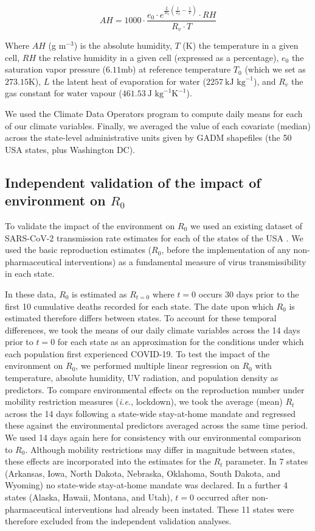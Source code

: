 \documentclass[12pt,english,a4paper]{article}
\newcommand{\virus}{SARS-CoV-2\xspace}
\newcommand{\disease}{COVID-19\xspace}
\newcommand{\RO}{$R_0$\xspace}
\begin{document}
\begin{equation}
     AH = 1000 \cdot \frac{e_0 \cdot e^{\frac{L}{R_v}(\frac{1}{T_0} - \frac{1}{T})} \cdot RH}{R_v \cdot T}
\end{equation}

Where $AH$ (g m$^{-3}$) is the absolute humidity, $T$ (K) the temperature in a given cell, $RH$ the relative humidity in a given cell (expressed as a percentage), $e_0$ the saturation vapor pressure ($6.11$mb) at reference temperature $T_0$ (which we set as $273.15$K), $L$ the latent heat of evaporation for water ($2257\ \text{kJ\ kg}^{-1}$), and $R_v$ the gas constant for water vapour ($461.53\ \text{J\ kg}^{-1} \text{K}^{-1}$).

We used the Climate Data Operators program\cite{Schulzweida2019} to compute daily means for each of our climate variables. Finally, we averaged the value of each covariate (median) across the state-level administrative units given by GADM shapefiles\cite{GADM} (the 50 USA states, plus Washington DC).


\subsection*{Independent validation of the impact of environment on \RO}

To validate the impact of the environment on \RO we used an existing dataset of \virus transmission rate estimates for each of the states of the USA \cite{Unwin2020a}. 
We used the basic reproduction estimates (\RO, before the implementation of any non-pharmaceutical interventions) as a fundamental measure of virus transmissibility in each state.

In these data, \RO is estimated as $R_{t=0}$ where $t=0$ occurs 30 days prior to the first 10 cumulative deaths recorded for each state\cite{Flaxman2020a, Unwin2020a}. The date upon which \RO is estimated therefore differs between states. To account for these temporal differences, we took the means of our daily climate variables across the 14 days prior to $t=0$ for each state as an approximation for the conditions under which each population first experienced \disease.
To test the impact of the environment on \RO, we performed multiple linear regression on \RO with temperature, absolute humidity, UV radiation, and population density as predictors. 
To compare environmental effects on the reproduction number under mobility restriction measures (\emph{i.e.}, lockdown), we took the average (mean) $R_t$ across the 14 days following a state-wide stay-at-home mandate and regressed these against the environmental predictors averaged across the same time period. We used 14 days again here for consistency with our environmental comparison to \RO. Although mobility restrictions may differ in magnitude between states, these effects are incorporated into the estimates for the $R_t$ parameter.
In 7 states (Arkansas, Iowa, North Dakota, Nebraska, Oklahoma, South Dakota, and Wyoming) no state-wide stay-at-home mandate was declared. In a further 4 states (Alaska, Hawaii, Montana, and Utah), $t=0$ occurred after non-pharmaceutical interventions had already been instated.
These 11 states were therefore excluded from the independent validation analyses. 
\end{document}
